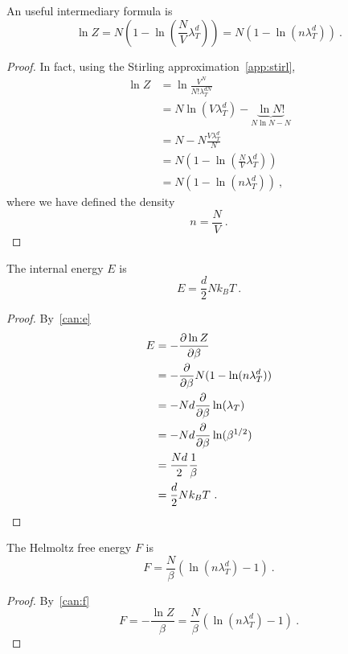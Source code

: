     An useful intermediary formula is 
    \begin{equation*}
        \ln Z = N (1 - \ln (\frac{N}{V} \lambda_T^d)) = N (1 - \ln (n \lambda_T^d)) ~.
    \end{equation*}
    \begin{proof}
        In fact, using the Stirling approximation~\eqref{app:stirl},
        \begin{equation*}
        \begin{aligned}
            \ln Z & = \ln \frac{V^N}{N! \lambda^{dN}_T} \\ & = N \ln (V \lambda_T^d) - \underbrace{\ln N!}_{N \ln N - N} \\ & = N - N \frac{V \lambda_T^d}{N} \\ & = N (1 - \ln (\frac{N}{V} \lambda_T^d)) \\ & = N (1 - \ln (n \lambda_T^d))  ~,
        \end{aligned}
        \end{equation*}
        where we have defined the density
        \begin{equation*}
            n = \frac{N}{V} ~.
        \end{equation*}
    \end{proof}
    
    The internal energy $E$ is 
    \begin{equation*}
        E = \frac{d}{2} N k_B T ~.
    \end{equation*}
    \begin{proof}
        By~\eqref{can:e}
        \begin{equation*}
        \begin{aligned}
            E & = - \frac{\partial\ln Z}{\partial\beta} \\ & = - \frac{\partial}{\partial\beta} N (1 - \ln (n \lambda_T^d)) \\ & = - Nd \frac{\partial}{\partial\beta} \ln (\lambda_T) \\ & = - Nd \frac{\partial}{\partial\beta} \ln (\beta^{1/2}) \\ & = \frac{Nd}{2} \frac{1}{\beta} \\ & = \frac{d}{2} N k_B T ~.
        \end{aligned}
        \end{equation*}
    \end{proof}
    
    The Helmoltz free energy $F$ is 
    \begin{equation*}
        F = \frac{N}{\beta} (\ln (n \lambda_T^d) - 1) ~.
    \end{equation*}
    \begin{proof}
        By~\eqref{can:f}
        \begin{equation*}
            F = - \frac{\ln Z}{\beta} = \frac{N}{\beta} (\ln (n \lambda_T^d) - 1) ~.
        \end{equation*}
    \end{proof}
    
